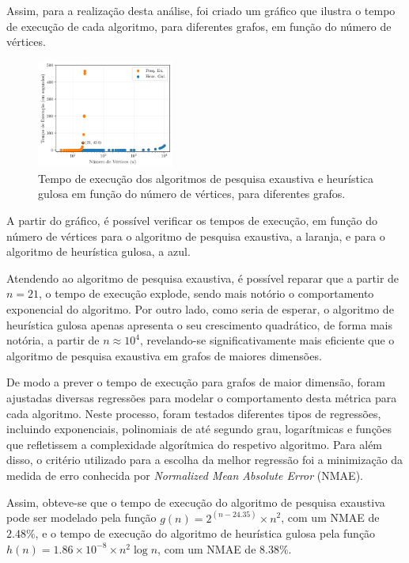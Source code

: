 \documentclass[mirror]{revdetua}
\begin{document}
Assim, para a realização desta análise, foi criado um gráfico que ilustra o tempo de execução de cada algoritmo, para diferentes grafos, em função do número de vértices.

\begin{figure}[h]
    \centering
    \includegraphics[width=0.4\textwidth]{../assets/execTIME.png}
    \caption{Tempo de execução dos algoritmos de pesquisa exaustiva e heurística gulosa em função do número de vértices, para diferentes grafos.}
    \label{fig:exectime}
\end{figure}

A partir do gráfico, é possível verificar os tempos de execução, em função do número de vértices para o algoritmo de pesquisa exaustiva, a laranja, e para o algoritmo de heurística gulosa, a azul. 

Atendendo ao algoritmo de pesquisa exaustiva, é possível reparar que a partir de $n = 21$, o tempo de execução explode, sendo mais notório o comportamento exponencial do algoritmo. Por outro lado, como seria de esperar, o algoritmo de heurística gulosa apenas apresenta o seu crescimento quadrático, de forma mais notória, a partir de $n \approx 10^4$, revelando-se significativamente mais eficiente que o algoritmo de pesquisa exaustiva em grafos de maiores dimensões.

De modo a prever o tempo de execução para grafos de maior dimensão, foram ajustadas diversas regressões para modelar o comportamento desta métrica para cada algoritmo. Neste processo, foram testados diferentes tipos de regressões, incluindo exponenciais, polinomiais de até segundo grau, logarítmicas e funções que refletissem a complexidade algorítmica do respetivo algoritmo. Para além disso, o critério utilizado para a escolha da melhor regressão foi a minimização da medida de erro conhecida por \textit{Normalized Mean Absolute Error} (NMAE).

Assim, obteve-se que o tempo de execução do algoritmo de pesquisa exaustiva pode ser modelado pela função $g(n) = 2^{(n - 24.35)} \times n^2$, com um NMAE de $2.48\%$, e o tempo de execução do algoritmo de heurística gulosa pela função $h(n) = 1.86 \times 10^{-8} \times n^2 \log n$, com um NMAE de $8.38\%$.
\end{document}
